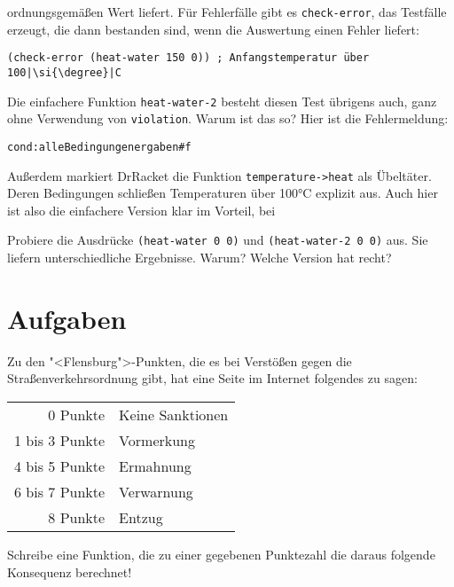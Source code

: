 ordnungsgemäßen Wert liefert.  Für Fehlerfälle gibt es
\lstinline{check-error}, das Testfälle erzeugt, die dann bestanden sind,
wenn die Auswertung einen Fehler liefert:
%
\begin{lstlisting}
(check-error (heat-water 150 0)) ; Anfangstemperatur über 100|\si{\degree}|C
\end{lstlisting}
%
Die einfachere Funktion \lstinline{heat-water-2} besteht diesen Test
übrigens auch, ganz ohne Verwendung von \lstinline{violation}.  Warum ist das so?
Hier ist die Fehlermeldung:
%
\begin{alltt}
{\color{red}cond: alle Bedingungen ergaben #f}
\end{alltt}
%
Außerdem markiert DrRacket die Funktion \lstinline{temperature->heat}
als Übeltäter.  Deren Bedingungen schließen Temperaturen über 100\si{\degree}C
explizit aus.  Auch hier ist also die einfachere Version klar im
Vorteil, bei

\begin{aufgabeinline}
  Probiere die Ausdrücke \lstinline{(heat-water 0 0)} und
  \lstinline{(heat-water-2 0 0)} aus.  Sie liefern unterschiedliche
  Ergebnisse.  Warum?  Welche Version hat recht?
\end{aufgabeinline}

\section*{Aufgaben}

\begin{aufgabe}
Zu den "<Flensburg">-Punkten, die es bei Verstößen gegen die
Straßenverkehrsordnung gibt, hat eine Seite im Internet folgendes zu
sagen:
%
\begin{center}
  \begin{tabular}{rl}
    0 Punkte & Keine Sanktionen\\
    1 bis 3 Punkte & Vormerkung\\
    4 bis 5 Punkte & Ermahnung\\
    6 bis 7 Punkte & Verwarnung\\
    8 Punkte & Entzug
  \end{tabular}
\end{center}
%
Schreibe eine Funktion, die zu einer gegebenen Punktezahl die daraus
folgende Konsequenz berechnet!
\end{aufgabe}

